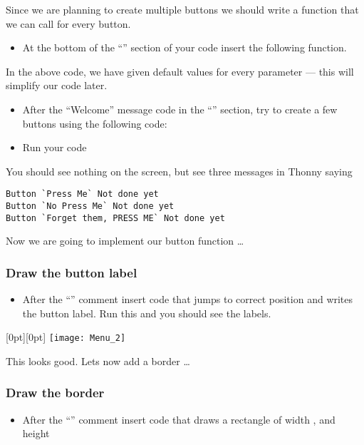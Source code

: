 \documentclass{coderdojo}
\newcommand\TODO[1]{
\begin{itemize}
\item[\todoSymbol] \color{todo} #1
\end{itemize}}
\begin{document}
Since we are planning to create multiple buttons we should write a function that we can call for every button.

\TODO{At the bottom of the ``''  section of your code insert the following function. }  


In the above code, we have given default values for every parameter --- this will simplify our code later.

\TODO{After the ``Welcome'' message code in the ``\code{Build sceen}''  section, try to create a few buttons using the following code:} 
 

\TODO{Run your code} 

You should see nothing on the screen, but see three messages in Thonny saying  

\begin{verbatim}
Button `Press Me` Not done yet
Button `No Press Me` Not done yet
Button `Forget them, PRESS ME` Not done yet
\end{verbatim}

Now we are going to implement our button function \ldots

\subsubsection{Draw the button label}

\vspace{6pt}

\TODO{After the  ``'' comment insert code that jumps \code{bob} to correct position and writes the button label. Run this and you should see the labels.}

\mbox{}\hfill\raisebox{0cm}[0pt][0pt]{%
	\texttt{[image: Menu\_2]}
}\hspace*{-1.5cm}

This looks good. Lets now add a border \ldots 

\subsubsection{Draw the border}

\TODO{After the  ``'' comment insert code that draws a 
rectangle of width \code{w}, and height \code{h}}
\end{document}
